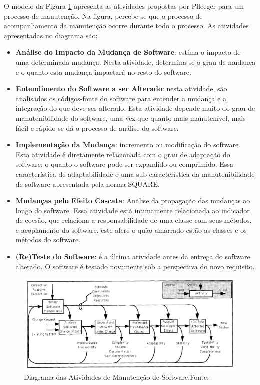O modelo da Figura \ref{img:modelo_manutencao} apresenta as atividades propostas por Pfleeger \cite{pfleeger_framework_1990} para um processo de manutenção. Na figura, percebe-se que o processo de acompanhamento da manutenção ocorre durante todo o processo. As atividades apresentadas no diagrama são:

\begin{itemize}
\item \textbf{Análise do Impacto da Mudança de Software}: estima o impacto de uma determinada mudança. Nesta atividade, determina-se o grau de mudança e o quanto esta mudança impactará no resto do software. 
\item \textbf{Entendimento do Software a ser Alterado}: nesta atividade, são analisados os códigos-fonte do software para entender a mudança e a integração do que deve ser alterado. Esta atividade depende muito do grau de manutenibilidade do software, uma vez que quanto mais manutenível, mais fácil e rápido se dá o processo de análise do software.
\item \textbf{Implementação da Mudança}: incremento ou modificação do software. Esta atividade é diretamente relacionada com o grau de adaptação do software; o quanto o software pode ser expandido ou comprimido. Essa característica de adaptabilidade é uma sub-característica da manutenibilidade de software apresentada pela norma SQUARE. 
\item \textbf{Mudanças pelo Efeito Cascata}: Análise da propagação das mudanças ao longo do software. Essa atividade está intimamente relacionada ao indicador de coesão, que relaciona a responsabilidade de uma classe com seus métodos, e acoplamento do software, este afere o quão amarrado estão as classes e os métodos do software.
\item \textbf{(Re)Teste do Software}: é a última atividade antes da entrega do software alterado. O software é testado novamente sob a perspectiva do novo requisito.
\end{itemize}

\graphicspath{{figuras/}}
\begin{figure}[h!]
\centering
\includegraphics[scale=0.50]{Manutencao}
\caption{Diagrama das Atividades de Manutenção de Software.Fonte:\cite{pfleeger_framework_1990}}
\label{img:modelo_manutencao}
\end{figure}

